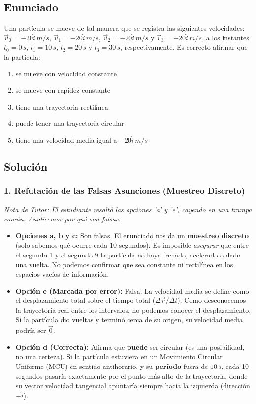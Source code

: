 \documentclass[12pt, a4paper]{article}
\begin{document}
\subsection*{Enunciado}
Una partícula se mueve de tal manera que se registra las siguientes velocidades: $\vec{v}_0 = -20\hat{i}\,\si{m/s}$, $\vec{v}_1 = -20\hat{i}\,\si{m/s}$, $\vec{v}_2 = -20\hat{i}\,\si{m/s}$ y $\vec{v}_3 = -20\hat{i}\,\si{m/s}$, a los instantes $t_0 = 0\,\si{s}$, $t_1 = 10\,\si{s}$, $t_2 = 20\,\si{s}$ y $t_3 = 30\,\si{s}$, respectivamente. Es correcto afirmar que la partícula:
\begin{enumerate}[label=\alph*)]
    \item se mueve con velocidad constante
    \item se mueve con rapidez constante
    \item tiene una trayectoria rectilínea
    \item puede tener una trayectoria circular
    \item tiene una velocidad media igual a $-20\hat{i}\,\si{m/s}$
\end{enumerate}

\subsection*{Solución}

\subsubsection*{1. Refutación de las Falsas Asunciones (Muestreo Discreto)}
\textit{Nota de Tutor: El estudiante resaltó las opciones 'a' y 'e', cayendo en una trampa común. Analicemos por qué son falsas.}

\begin{itemize}
    \item \textbf{Opciones a, b y c:} Son falsas. El enunciado nos da un \textbf{muestreo discreto} (solo sabemos qué ocurre cada 10 segundos). Es imposible \textit{asegurar} que entre el segundo 1 y el segundo 9 la partícula no haya frenado, acelerado o dado una vuelta. No podemos confirmar que sea constante ni rectilínea en los espacios vacíos de información.
    \item \textbf{Opción e (Marcada por error):} Falsa. La velocidad media se define como el desplazamiento total sobre el tiempo total ($\Delta \vec{r}/\Delta t$). Como desconocemos la trayectoria real entre los intervalos, no podemos conocer el desplazamiento. Si la partícula dio vueltas y terminó cerca de su origen, su velocidad media podría ser $\vec{0}$.
    \item \textbf{Opción d (Correcta):} Afirma que \textbf{puede} ser circular (es una posibilidad, no una certeza). Si la partícula estuviera en un Movimiento Circular Uniforme (MCU) en sentido antihorario, y su \textbf{período} fuera de $10\,\si{s}$, cada 10 segundos pasaría exactamente por el punto más alto de la trayectoria, donde su vector velocidad tangencial apuntaría siempre hacia la izquierda (dirección $-\hat{i}$).
\end{itemize}
\end{document}
